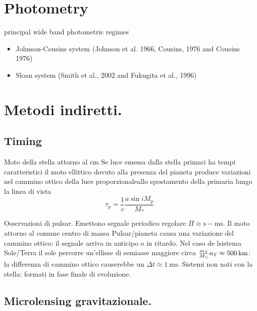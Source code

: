 \section{Photometry}

\begin{frame}{principal wide band photometric regimes}
\cite{mallama2017comprehensive}
\begin{itemize}
\item Johnson-Cousins system (Johnson et al. 1966, Cousins, 1976 and Cousins 1976)
\item Sloan system (Smith et al., 2002 and Fukugita et al., 1996)
\end{itemize}
\end{frame}

\section{Metodi indiretti.}

\subsection{Timing}

\begin{frame}{Moto della stella attorno al cm}
Se luce emessa dalla stella primari ha tempi caratteristici il moto ellittico dovuto alla presenza del pianeta produce variazioni nel cammino ottico della luce proporzionaleallo spostamento della primaria lungo la linea di vista
\begin{equation*}
    \tau_p=\frac{1}{c}\frac{a\sin{i}M_p}{M_*}
\end{equation*}
\end{frame}

\begin{frame}{Osservazioni di pulsar.}
Emettono segnale periodico regolare $\Pi\approx\si{\second}-\si{\milli\second}$. Il moto attorno al comune centro di massa Pulsar/pianeta causa una variazione del cammino ottico: il segnale arriva in anticipo o in ritardo.
Nel caso de lsistema Sole/Terra il sole percorre un'ellisse di semiasse maggiore circa $\frac{m_T}{M_{\odot}{}}a_T\approx\SI{500}{\kilo\meter}$: la differenza di cammino ottico causerebbe un $\Delta t\approx\SI{1}{\milli\second}$.
Sistemi non nati con la stella: formati in fase finale di evoluzione.
\end{frame}

\subsection{Microlensing gravitazionale.}

